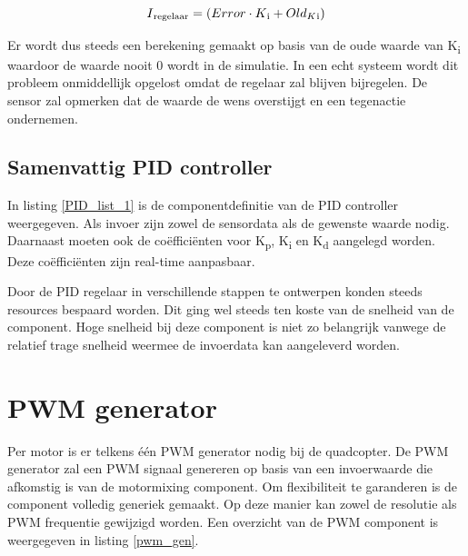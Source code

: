 				\[ I\textsubscript{regelaar} = (Error \cdot K\textsubscript{i} + Old_K\textsubscript{i} ) \] 

			\par Er wordt dus steeds een berekening gemaakt op basis van de oude waarde van K\textsubscript{i} waardoor de waarde nooit 0 wordt in de simulatie. In een echt systeem wordt dit probleem onmiddellijk opgelost omdat de regelaar zal blijven bijregelen. De sensor zal opmerken dat de waarde de wens overstijgt en een tegenactie ondernemen. 


		\subsection{Samenvattig PID controller}

			\par In listing \ref{PID_list_1} is de componentdefinitie van de PID controller weergegeven. Als invoer zijn zowel de sensordata als de gewenste waarde nodig. Daarnaast moeten ook de co\"effici\"enten voor  K\textsubscript{p}, K\textsubscript{i} en K\textsubscript{d} aangelegd worden. Deze co\"effici\"enten zijn real-time aanpasbaar.
\newpage
			\par Door de PID regelaar in verschillende stappen te ontwerpen konden steeds resources bespaard worden. Dit ging wel steeds ten koste van de snelheid van de component. Hoge snelheid bij deze component is niet zo belangrijk vanwege de relatief trage snelheid weermee de invoerdata kan aangeleverd worden. 

				

	\section{PWM generator}

		\par Per motor is er telkens \'e\'en PWM generator nodig bij de quadcopter. De PWM generator zal een PWM signaal genereren op basis van een invoerwaarde die afkomstig is van de motormixing component. Om flexibiliteit te garanderen is de component volledig generiek gemaakt. Op deze manier kan zowel de resolutie als PWM frequentie gewijzigd worden. Een overzicht van de PWM component is weergegeven in listing \ref{pwm_gen}. 

			

